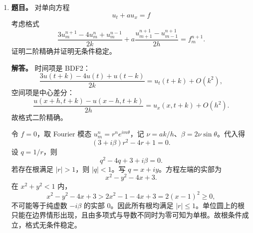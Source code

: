 ﻿\documentclass[UTF8,12pt]{ctexart}
\begin{document}
\begin{enumerate}[label=\textbf{\arabic*.},leftmargin=2.2em]
\textbf{解答。} 因为
\[
\widehat P=\begin{pmatrix}I_k&0\\0&0\end{pmatrix}
\]
满足 \(\widehat P^2=\widehat P=\widehat P^\ast\)，而 \(Q\) 酉，所以
\[
P^2=P,\qquad P^\ast=P.
\]
其值域正是 \(Q\) 前 \(k\) 列张成的 \(E_k\)，故 \(P\) 是正交投影。

把 \(X^{(0)}\) 写到 \(Q\) 坐标中：
\[
Q^{-1}X^{(0)}=\begin{pmatrix}Y_1\\Y_2\end{pmatrix},
\qquad Y_1\in\mathbb R^{k\times k}.
\]
条件 \(PX^{(0)}\) 单射等价于 \(Y_1\) 可逆。取
\[
\Lambda=\operatorname{diag}(\lambda_1,\ldots,\lambda_k).
\]
令
\[
\Gamma=Y_1^{-1}\Lambda Y_1.
\]
则
\[
AX^{(m)}-X^{(m)}\Gamma
=Q\begin{pmatrix}
D_1^{m+1}Y_1-D_1^mY_1\Gamma\\
D_2^{m+1}Y_2-D_2^mY_2\Gamma
\end{pmatrix}.
\]
按 \(\Gamma\) 的选择，第一块为零；第二块含有 \(D_2^m\)，其范数至多 \(|\lambda_{k+1}|^m\) 乘初始常数。另一方面
\[
PX^{(m)}y=Q\begin{pmatrix}D_1^mY_1y\\0\end{pmatrix},
\]
其范数至少 \(|\lambda_k|^m\|Y_1y\|\)。相除即得
\[
\frac{\|(AX^{(m)}-X^{(m)}\Gamma)y\|}{\|PX^{(m)}y\|}
\le
\left(\frac{|\lambda_{k+1}|}{|\lambda_k|}\right)^m
\frac{\|(AX^{(0)}-X^{(0)}\Gamma)y\|}{\|PX^{(0)}y\|}.
\]
这说明由前 \(k\) 个特征方向张成的不变子空间以谱间隙比率收敛。

\item \textbf{题目。} 对单向方程
\[
u_t+a u_x=f
\]
考虑格式
\[
\frac{3u_m^{n+1}-4u_m^n+u_m^{n-1}}{2k}
+a\frac{u_{m+1}^{n+1}-u_{m-1}^{n+1}}{2h}
=f_m^{n+1}.
\]
证明二阶精确并证明无条件稳定。

\textbf{解答。} 时间项是 BDF2：
\[
\frac{3u(t+k)-4u(t)+u(t-k)}{2k}
=u_t(t+k)+O(k^2),
\]
空间项是中心差分：
\[
\frac{u(x+h,t+k)-u(x-h,t+k)}{2h}=u_x(x,t+k)+O(h^2).
\]
故格式二阶精确。

令 \(f=0\)，取 Fourier 模态 \(u_m^n=r^n e^{im\theta}\)，记 \(\nu=ak/h\)、\(\beta=2\nu\sin\theta\)。代入得
\[
(3+i\beta)r^2-4r+1=0.
\]
设 \(q=1/r\)，则
\[
q^2-4q+3+i\beta=0.
\]
若存在根满足 \(|r|>1\)，则 \(|q|<1\)。写 \(q=x+iy\)。方程左端的实部为
\[
x^2-y^2-4x+3.
\]
在 \(x^2+y^2<1\) 内，
\[
x^2-y^2-4x+3
>2x^2-1-4x+3
=2(x-1)^2\ge0,
\]
不可能等于纯虚数 \(-i\beta\) 的实部 \(0\)。因此所有根均满足 \(|r|\le1\)。单位圆上的根只能在边界情形出现，且由多项式与导数不同时为零可知为单根。故根条件成立，格式无条件稳定。


\end{enumerate}
\end{document}
